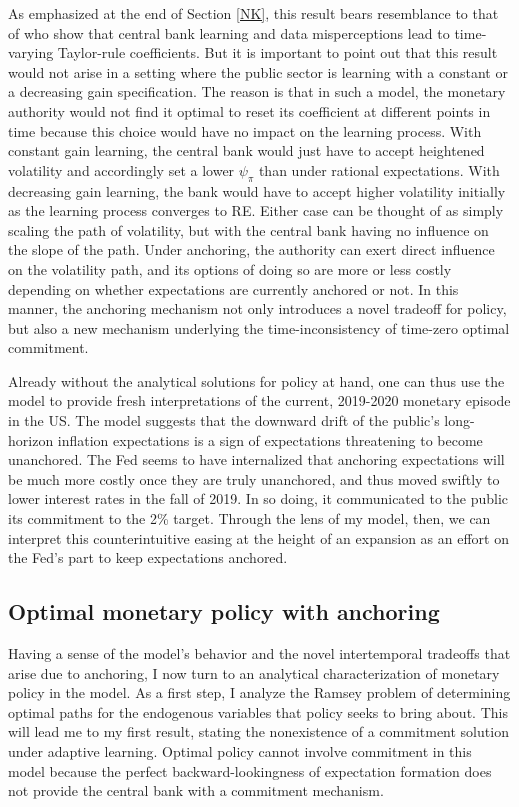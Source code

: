 \documentclass[11pt]{article}
\renewcommand{\[}{\begin{equation}}
\renewcommand{\]}{\end{equation}}
\begin{document}
As emphasized at the end of Section \ref{NK}, this result bears resemblance to that of \cite{LUBIK201685} who show that central bank learning and data misperceptions lead to time-varying Taylor-rule coefficients. But it is important to point out that this result would not arise in a setting where the public sector is learning with a constant or a decreasing gain specification. The reason is that in such a model, the monetary authority would not find it optimal to reset its coefficient at different points in time because this choice would have no impact on the learning process. With constant gain learning, the central bank would just have to accept heightened volatility and accordingly set a lower $\psi_{\pi}$ than under rational expectations. With decreasing gain learning, the bank would have to accept higher volatility initially as the learning process converges to RE. Either case can be thought of as simply scaling the path of volatility, but with the central bank having no influence on the slope of the path. Under anchoring, the authority can exert direct influence on the volatility path, and its options of doing so are more or less costly depending on whether expectations are currently anchored or not. In this manner, the anchoring mechanism not only introduces a novel tradeoff for policy, but also a new mechanism underlying the time-inconsistency of time-zero optimal commitment. 

Already without the analytical solutions for policy at hand, one can thus use the model to provide fresh interpretations of the current, 2019-2020 monetary episode in the US. The model suggests that the downward drift of the public's long-horizon inflation expectations is a sign of expectations threatening to become unanchored. The Fed seems to have internalized that anchoring expectations will be much more costly once they are truly unanchored, and thus moved swiftly to lower interest rates in the fall of 2019. In so doing, it communicated to the public its commitment to the 2\% target. Through the lens of my model, then, we can interpret this counterintuitive easing at the height of an expansion as an effort on the Fed's part to keep expectations anchored. 


\subsection{Optimal monetary policy with anchoring}
Having a sense of the model's behavior and the novel intertemporal tradeoffs that arise due to anchoring, I now turn to an analytical characterization of monetary policy in the model. As a first step, I analyze the Ramsey problem of determining optimal paths for the endogenous variables that policy seeks to bring about. This will lead me to my first result, stating the nonexistence of a commitment solution under adaptive learning. Optimal policy cannot involve commitment in this model because the perfect backward-lookingness of expectation formation does not provide the central bank with a commitment mechanism. 
\end{document}

